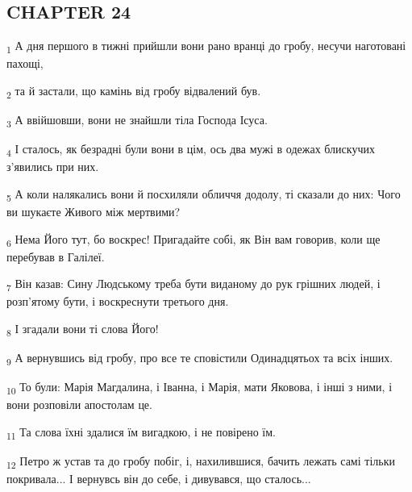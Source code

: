 \subsection{CHAPTER 24}
\begin{tcolorbox}
\textsubscript{1} А дня першого в тижні прийшли вони рано вранці до гробу, несучи наготовані пахощі,
\end{tcolorbox}
\begin{tcolorbox}
\textsubscript{2} та й застали, що камінь від гробу відвалений був.
\end{tcolorbox}
\begin{tcolorbox}
\textsubscript{3} А ввійшовши, вони не знайшли тіла Господа Ісуса.
\end{tcolorbox}
\begin{tcolorbox}
\textsubscript{4} І сталось, як безрадні були вони в цім, ось два мужі в одежах блискучих з'явились при них.
\end{tcolorbox}
\begin{tcolorbox}
\textsubscript{5} А коли налякались вони й посхиляли обличчя додолу, ті сказали до них: Чого ви шукаєте Живого між мертвими?
\end{tcolorbox}
\begin{tcolorbox}
\textsubscript{6} Нема Його тут, бо воскрес! Пригадайте собі, як Він вам говорив, коли ще перебував в Галілеї.
\end{tcolorbox}
\begin{tcolorbox}
\textsubscript{7} Він казав: Сину Людському треба бути виданому до рук грішних людей, і розп'ятому бути, і воскреснути третього дня.
\end{tcolorbox}
\begin{tcolorbox}
\textsubscript{8} І згадали вони ті слова Його!
\end{tcolorbox}
\begin{tcolorbox}
\textsubscript{9} А вернувшись від гробу, про все те сповістили Одинадцятьох та всіх інших.
\end{tcolorbox}
\begin{tcolorbox}
\textsubscript{10} То були: Марія Магдалина, і Іванна, і Марія, мати Яковова, і інші з ними, і вони розповіли апостолам це.
\end{tcolorbox}
\begin{tcolorbox}
\textsubscript{11} Та слова їхні здалися їм вигадкою, і не повірено їм.
\end{tcolorbox}
\begin{tcolorbox}
\textsubscript{12} Петро ж устав та до гробу побіг, і, нахилившися, бачить лежать самі тільки покривала... І вернувсь він до себе, і дивувався, що сталось...
\end{tcolorbox}
